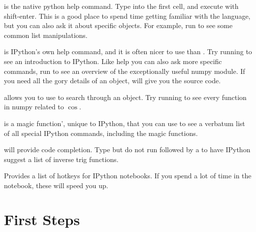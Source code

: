 \documentclass[justified, nobib]{tufte-handout}
\begin{document}
\begin{description}[font=\tt, leftmargin=0cm]

  \item[\ipythoninline{help()}] is the native python help command.
  Type  into the first cell, and execute with
  shift-enter.
  This is a good place to spend time getting familiar with the language, but
  you can also ask it about specific objects.
  For example, run  to see some common list
  manipulations.

  \item[\ipythoninline{?}] is IPython's own help command, and it is often nicer
  to use than .
  Try running  to see an introduction to IPython.
  Like help you can also ask more specific commands, run
   to see an overview of the exceptionally
  useful numpy module.
  If you need all the gory details of an object,  will
  give you the source code.

  \item[\textinline{<regex>}\ipythoninline{?}] allows you to use
   to search through an object.
  Try running  to see every
  function in numpy related to $\cos$.

  \item[\PY{o}{\PYZpc{}}\ipythoninline{quickref}] is a magic function', unique to IPython,
  that you can use to see a verbatum list of all special IPython commands,
  including the magic functions.

  \item[\textinline{<tab>}] will provide code completion.
  Type but do not run  followed by a
   to have IPython suggest a list of inverse trig functions.

  \item[\textinline{Control-m h}] Provides a list of hotkeys for IPython
  notebooks.
  If you spend a lot of time in the notebook, these will speed you up.

\end{description}

\pagebreak
\section*{First Steps}


\pagebreak
\end{document}
